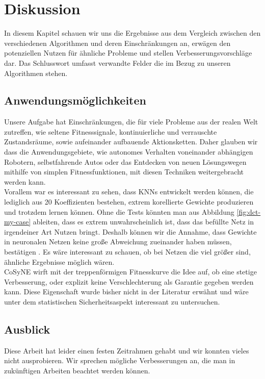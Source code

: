 \chapter{Diskussion}
    In diesem Kapitel schauen wir uns die Ergebnisse aus dem Vergleich zwischen den verschiedenen Algorithmen und deren Einschränkungen an, erwägen den potenziellen Nutzen für ähnliche Probleme und stellen Verbesserungsvorschläge dar. Das Schlusswort umfasst verwandte Felder die im Bezug zu unseren Algorithmen stehen.
    \section{Anwendungsmöglichkeiten}
        Unsere Aufgabe hat Einschränkungen, die für viele Probleme aus der realen Welt zutreffen, wie seltene Fitnesssignale, kontinuierliche und verrauschte Zustandsräume, sowie aufeinander aufbauende Aktionsketten. Daher glauben wir dass die Anwendungsgebiete, wie autonomes Verhalten voneinander abhängigen Robotern, selbstfahrende Autos oder das Entdecken von neuen Lösungswegen mithilfe von simplen Fitnessfunktionen, mit diesen Techniken weitergebracht werden kann. \\

        \noindent
        Vorallem war es interessant zu sehen, dass KNNs entwickelt werden können, die lediglich aus 20 Koeffizienten bestehen, extrem korellierte Gewichte produzieren und trotzdem lernen können. Ohne die Tests könnten man aus Abbildung \ref{fig:dct-my-case} ableiten, dass es extrem unwahrscheinlich ist, dass das befüllte Netz in irgendeiner Art Nutzen bringt. Deshalb können wir die Annahme, dass Gewichte in neuronalen Netzen keine große Abweichung zueinander haben müssen, bestätigen \cite{cosyne1}. Es wäre interessant zu schauen, ob bei Netzen die viel größer sind, ähnliche Ergebnisse möglich wären. \\

        \noindent
        CoSyNE wirft mit der treppenförmigen Fitnesskurve die Idee auf, ob eine stetige Verbesserung, oder explizit keine Verschlechterung als Garantie gegeben werden kann. Diese Eigenschaft wurde bisher nicht in der Literatur erwähnt und wäre unter dem statistischen Sicherheitsaspekt interessant zu untersuchen.

\newpage

    \section{Ausblick} \label{ausblick}
        Diese Arbeit hat leider einen festen Zeitrahmen gehabt und wir konnten vieles nicht ausprobieren. Wir sprechen mögliche Verbesserungen an, die man in zukünftigen Arbeiten beachtet werden können.

